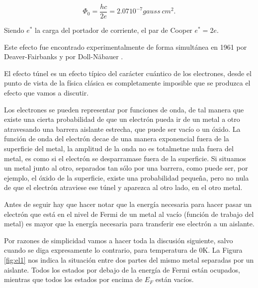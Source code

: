 \begin{equation}
    \Phi_0 = \frac{h c}{2 e} = 2.07 10^{-7} gauss\ cm^2 .
\end{equation}

Siendo $e^*$ la carga del portador de corriente, el par de Cooper $e^* = 2e$.

Este efecto fue encontrado experimentalmente de forma simultánea en 1961 por Deaver-Fairbanks \cite{deaver} y por Doll-Näbauer \cite{doll}.

El efecto túnel es un efecto típico del carácter cuántico de los electrones, desde el punto de vista de la física clásica es completamente imposible que se produzca el efecto que vamos a discutir.

Los electrones se pueden representar por funciones de onda, de tal manera que existe una cierta probabilidad de que un electrón pueda ir de un metal a otro atravesando una barrera aislante estrecha, que puede ser vacío o un óxido. La función de onda del electrón decae de una manera exponencial fuera de la superficie del metal, la amplitud de la onda no es totalmetne nula fuera del metal, es como si el electrón se desparramase fuera de la superficie. Si situamos un metal junto al otro, separados tan sólo por una barrera, como puede ser, por ejemplo, el óxido de la superficie, existe una probabilidad pequeña, pero no nula de que el electrón atraviese ese túnel y aparezca al otro lado, en el otro metal.

Antes de seguir hay que hacer notar que la energía necesaria para hacer pasar un electrón que está en el nivel de Fermi de un metal al vacío (función de trabajo del metal) es mayor que la energía necesaria para transferir ese electrón a un aislante.

Por razones de simplicidad vamos a hacer toda la discusión siguiente, salvo cuando se diga expresamente lo contrario, para temperatura de 0K. La Figura \ref{fig:el1} nos indica la situación entre dos partes del mismo metal separadas por un aislante. Todos los estados por debajo de la energía de Fermi están ocupados, mientras que todos los estados por encima de $E_F$ están vacíos.

